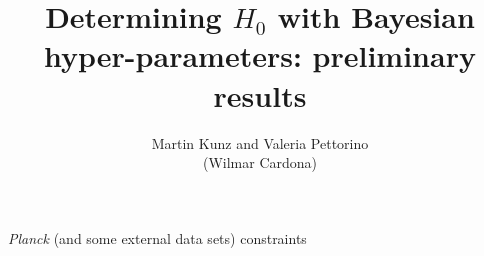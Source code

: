 \documentclass{beamer}
\author[Martin Kunz and Valeria Pettorino (Wilmar Cardona)]{Martin Kunz and Valeria Pettorino\\ (Wilmar Cardona)}
\title[Determining $H_0$ with Bayesian hyper-parameters: preliminary results]{Determining $H_0$ with Bayesian hyper-parameters: preliminary results}
\begin{document}
\begin{frame}{\textit{Planck} (and some external data sets) constraints}
\begin{columns}
\begin{column}{0.45\textwidth}
\centering
{} 
\end{column}
\begin{column}{0.45\textwidth}
\centering
{}
\end{column}
\end{columns}
\end{frame}
\end{document}

